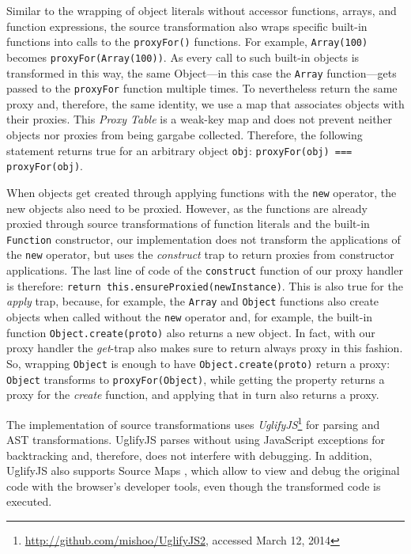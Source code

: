 Similar to the wrapping of object literals without accessor functions, arrays, and function expressions, the source transformation also wraps specific built-in functions into calls to the \lstinline{proxyFor()} functions.
For example, \lstinline{Array(100)} becomes \lstinline{proxyFor(Array(100))}.
As every call to such built-in objects is transformed in this way, the same Object---in this case the \lstinline{Array} function---gets passed to the \lstinline{proxyFor} function multiple times.
To nevertheless return the same proxy and, therefore, the same identity, we use a map that associates objects with their proxies.
This \emph{Proxy Table} is a weak-key map and does not prevent neither objects nor proxies from being gargabe collected.
Therefore, the following statement returns true for an arbitrary object \lstinline{obj}: \lstinline{proxyFor(obj) === proxyFor(obj)}.

When objects get created through applying functions with the \lstinline{new} operator, the new objects also need to be proxied.
However, as the functions are already proxied through source transformations of function literals and the built-in \lstinline{Function} constructor, our implementation does not transform the applications of the \lstinline{new} operator, but uses the \emph{construct} trap to return proxies from constructor applications.
The last line of code of the \lstinline{construct} function of our proxy handler is therefore: \lstinline{return this.ensureProxied(newInstance)}.
This is also true for the \emph{apply} trap, because, for example, the \lstinline{Array} and \lstinline{Object} functions also create objects when called without the \lstinline{new} operator and, for example, the built-in function \lstinline{Object.create(proto)} also returns a new object.
In fact, with our proxy handler the \emph{get}-trap also makes sure to return always proxy in this fashion.
So, wrapping \lstinline{Object} is enough to have \lstinline{Object.create(proto)} return a proxy: \lstinline{Object} transforms to \lstinline{proxyFor(Object)}, while getting the property returns a proxy for the \emph{create} function, and applying that in turn also returns a proxy.

The implementation of source transformations uses \emph{UglifyJS}\footnote{\url{http://github.com/mishoo/UglifyJS2}, accessed March 12, 2014} for parsing and AST transformations.
UglifyJS parses without using JavaScript exceptions for backtracking and, therefore, does not interfere with debugging.
In addition, UglifyJS also supports Source Maps , which allow to view and debug the original code with the browser's developer tools, even though the transformed code is executed.



